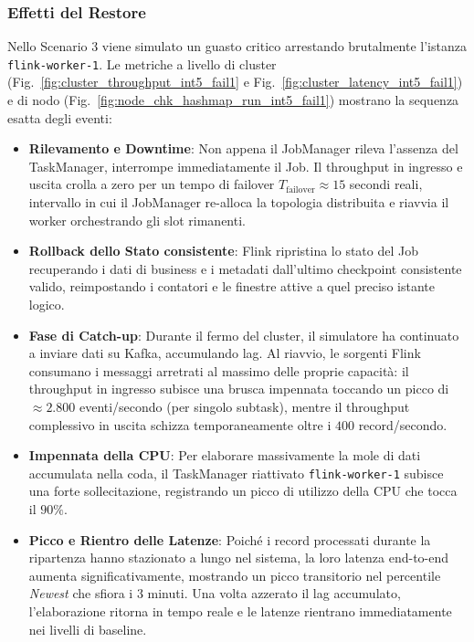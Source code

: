 \documentclass[conference]{IEEEtran}
\begin{document}
\subsubsection{Effetti del Restore}\label{subsubsec:restore_failover}

Nello Scenario 3 viene simulato un guasto critico arrestando brutalmente l'istanza \texttt{flink-worker-1}. Le metriche a livello di cluster (Fig.~\ref{fig:cluster_throughput_int5_fail1} e Fig.~\ref{fig:cluster_latency_int5_fail1}) e di nodo (Fig.~\ref{fig:node_chk_hashmap_run_int5_fail1}) mostrano la sequenza esatta degli eventi:
\begin{itemize}
    \item \textbf{Rilevamento e Downtime}: Non appena il JobManager rileva l'assenza del TaskManager, interrompe immediatamente il Job. Il throughput in ingresso e uscita crolla a zero per un tempo di failover $T_{\text{failover}} \approx 15$ secondi reali, intervallo in cui il JobManager re-alloca la topologia distribuita e riavvia il worker orchestrando gli slot rimanenti.
    \item \textbf{Rollback dello Stato consistente}: Flink ripristina lo stato del Job recuperando i dati di business e i metadati dall'ultimo checkpoint consistente valido, reimpostando i contatori e le finestre attive a quel preciso istante logico.
    \item \textbf{Fase di Catch-up}: Durante il fermo del cluster, il simulatore ha continuato a inviare dati su Kafka, accumulando lag. Al riavvio, le sorgenti Flink consumano i messaggi arretrati al massimo delle proprie capacità: il throughput in ingresso subisce una brusca impennata toccando un picco di $\approx 2.800$ eventi/secondo (per singolo subtask), mentre il throughput complessivo in uscita schizza temporaneamente oltre i $400$ record/secondo.
    \item \textbf{Impennata della CPU}: Per elaborare massivamente la mole di dati accumulata nella coda, il TaskManager riattivato \texttt{flink-worker-1} subisce una forte sollecitazione, registrando un picco di utilizzo della CPU che tocca il $90\%$.
    \item \textbf{Picco e Rientro delle Latenze}: Poiché i record processati durante la ripartenza hanno stazionato a lungo nel sistema, la loro latenza end-to-end aumenta significativamente, mostrando un picco transitorio nel percentile \textit{Newest} che sfiora i $3$ minuti. Una volta azzerato il lag accumulato, l'elaborazione ritorna in tempo reale e le latenze rientrano immediatamente nei livelli di baseline.
\end{itemize}
\end{document}
